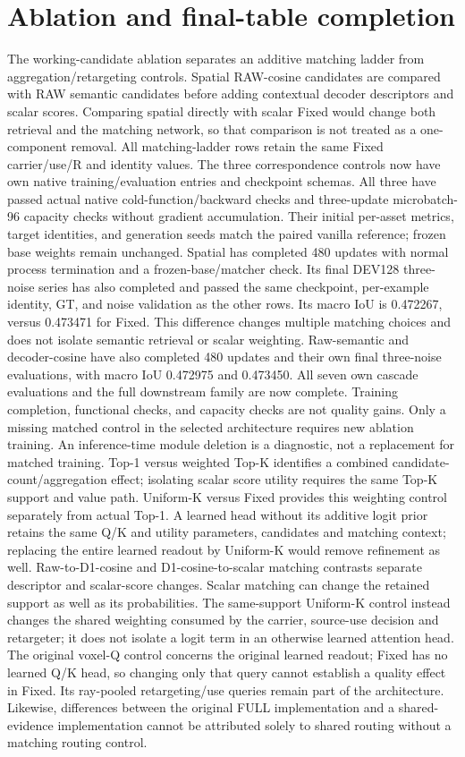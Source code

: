 \documentclass[10pt]{article}
\begin{document}
\section{Ablation and final-table completion}


The working-candidate ablation separates an additive matching ladder from
aggregation/retargeting controls. Spatial RAW-cosine candidates are compared
with RAW semantic candidates before adding contextual decoder descriptors
and scalar scores. Comparing spatial directly with scalar Fixed would change
both retrieval and the matching network, so that comparison is not treated
as a one-component removal. All matching-ladder rows retain the same Fixed carrier/use/R
and identity values. The three correspondence controls now have own native
training/evaluation entries and checkpoint schemas. All three have passed
actual native cold-function/backward checks and three-update microbatch-96
capacity checks without gradient accumulation. Their initial per-asset
metrics, target identities, and generation seeds match the paired vanilla
reference; frozen base weights remain unchanged. Spatial has completed
480 updates with normal process termination and a frozen-base/matcher check.
Its final DEV128 three-noise series has also completed and passed the same
checkpoint, per-example identity, GT, and noise validation as the other rows.
Its macro IoU is 0.472267, versus 0.473471 for Fixed. This difference changes
multiple matching choices and does not isolate semantic retrieval or scalar
weighting. Raw-semantic and decoder-cosine have also completed 480 updates
and their own final three-noise evaluations, with macro IoU 0.472975 and
0.473450. All seven own cascade evaluations and the full downstream family
are now complete. Training completion, functional checks, and capacity checks are
not quality gains.
Only a missing matched control in the selected architecture requires new
ablation training. An inference-time module deletion is a diagnostic, not a
replacement for matched training. Top-1 versus weighted Top-K identifies a
combined candidate-count/aggregation effect; isolating scalar score utility
requires the same Top-K support and value path. Uniform-K versus Fixed
provides this weighting control separately from actual Top-1. A learned
head without its additive logit prior retains the same Q/K and utility
parameters, candidates and matching context; replacing the entire learned
readout by Uniform-K would remove refinement as well. Raw-to-D1-cosine and
D1-cosine-to-scalar matching contrasts separate descriptor and scalar-score
changes. Scalar matching can change the retained support as well as its
probabilities. The same-support Uniform-K control instead changes the shared
weighting consumed by the carrier, source-use decision and retargeter; it
does not isolate a logit term in an otherwise learned attention head.
The original voxel-Q control concerns the original learned readout;
Fixed has no learned Q/K head, so changing only that query cannot establish
a quality effect in Fixed. Its ray-pooled retargeting/use queries remain
part of the architecture. Likewise, differences between
the original FULL implementation and a shared-evidence implementation cannot
be attributed solely to shared routing without a matching routing control.
\end{document}
